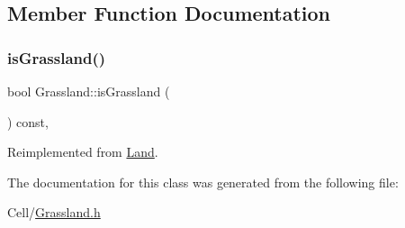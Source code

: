 \subsection{Member Function Documentation}
\mbox{\label{classGrassland_ac4f00629f20061d2ec9f792a42f7315c}} 
\subsubsection{\texorpdfstring{isGrassland()}{isGrassland()}}
{\footnotesize\ttfamily bool Grassland\+::is\+Grassland (\begin{DoxyParamCaption}{ }\end{DoxyParamCaption}) const\hspace{0.3cm}{\ttfamily [inline]}, {\ttfamily [virtual]}}



Reimplemented from \mbox{\hyperlink{classLand_aa79c16746d74c0493e66ce73f2fa0e0f}{Land}}.



The documentation for this class was generated from the following file\+:\begin{DoxyCompactItemize}
\item 
Cell/\mbox{\hyperlink{Grassland_8h}{Grassland.\+h}}\end{DoxyCompactItemize}

